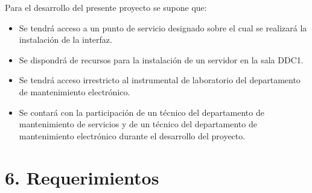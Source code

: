 \documentclass[
11pt, %
]{charter}
\begin{document}
Para el desarrollo del presente proyecto se supone que:

\begin{itemize}
	\item Se tendrá acceso a un punto de servicio designado sobre el cual se realizará la instalación de la interfaz.
	\item Se dispondrá de recursos para la instalación de un servidor en la sala DDC1.
	\item Se tendrá acceso irrestricto al instrumental de laboratorio del departamento de mantenimiento electrónico.
	\item Se contará con la participación de un técnico del departamento de mantenimiento de servicios y de un técnico del departamento de mantenimiento electrónico durante el desarrollo del proyecto.
\end{itemize}



\section{6. Requerimientos}
\label{sec:requerimientos}
\end{document}
